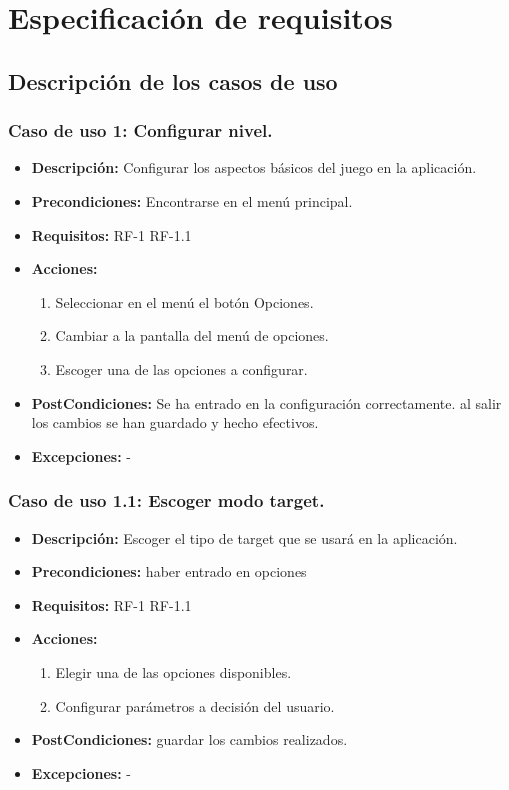 \section{Especificación de requisitos}

\subsection{Descripción de los casos de uso}
\subsubsection{Caso de uso 1: Configurar nivel.}
\begin{itemize}
	\item \textbf{Descripción:} Configurar los aspectos básicos del juego en la aplicación.
	\item \textbf{Precondiciones:} Encontrarse en el menú principal.
	\item \textbf{Requisitos:} RF-1 RF-1.1
	\item \textbf{Acciones:}
	\begin{enumerate}
		\item Seleccionar en el menú el botón Opciones.
		\item Cambiar a la pantalla del menú de opciones.		
		\item Escoger una de las opciones a configurar.		
	\end{enumerate}
	\item \textbf{PostCondiciones:} Se ha entrado en la configuración correctamente. al salir los cambios se han guardado y hecho efectivos.
	\item \textbf{Excepciones:} -
\end{itemize}
\subsubsection{Caso de uso 1.1: Escoger modo target.}
\begin{itemize}
	\item \textbf{Descripción:} Escoger el tipo de target que se usará en la aplicación.
	\item \textbf{Precondiciones:} haber entrado en opciones
	\item \textbf{Requisitos:} RF-1 RF-1.1
	\item \textbf{Acciones:}
	\begin{enumerate}
		\item Elegir una de las opciones disponibles.
		\item Configurar parámetros a decisión del usuario.
	\end{enumerate}
	\item \textbf{PostCondiciones:} guardar los cambios realizados.
	\item \textbf{Excepciones:} -
\end{itemize}
